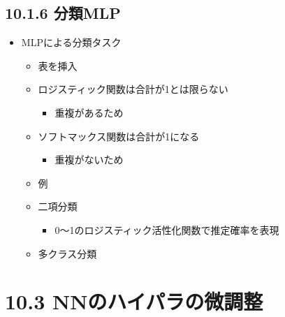 \hypertarget{ux5206ux985emlp}{%
\subsection{10.1.6 分類MLP}\label{ux5206ux985emlp}}

\begin{itemize}
\tightlist
\item
  MLPによる分類タスク

  \begin{itemize}
  \tightlist
  \item
    表を挿入
  \item
    ロジスティック関数は合計が1とは限らない

    \begin{itemize}
    \tightlist
    \item
      重複があるため
    \end{itemize}
  \item
    ソフトマックス関数は合計が1になる

    \begin{itemize}
    \tightlist
    \item
      重複がないため
    \end{itemize}
  \item
    例
  \item
    二項分類

    \begin{itemize}
    \tightlist
    \item
      0～1のロジスティック活性化関数で推定確率を表現
    \end{itemize}
  \item
    多クラス分類
  \end{itemize}
\end{itemize}

\hypertarget{nnux306eux30cfux30a4ux30d1ux30e9ux306eux5faeux8abfux6574}{%
\section{10.3
NNのハイパラの微調整}\label{nnux306eux30cfux30a4ux30d1ux30e9ux306eux5faeux8abfux6574}}

